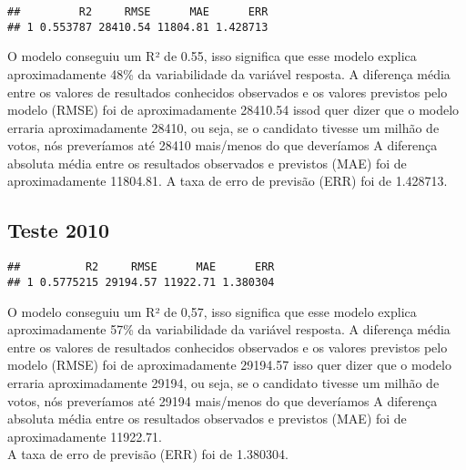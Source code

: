 \documentclass[]{article}
\newenvironment{Shaded}{\begin{snugshade}}{\end{snugshade}}
\newcommand{\KeywordTok}[1]{\textcolor[rgb]{0.13,0.29,0.53}{\textbf{#1}}}
\newcommand{\DataTypeTok}[1]{\textcolor[rgb]{0.13,0.29,0.53}{#1}}
\newcommand{\DecValTok}[1]{\textcolor[rgb]{0.00,0.00,0.81}{#1}}
\newcommand{\StringTok}[1]{\textcolor[rgb]{0.31,0.60,0.02}{#1}}
\newcommand{\OperatorTok}[1]{\textcolor[rgb]{0.81,0.36,0.00}{\textbf{#1}}}
\newcommand{\NormalTok}[1]{#1}
\begin{document}
\begin{verbatim}
##         R2     RMSE      MAE      ERR
## 1 0.553787 28410.54 11804.81 1.428713
\end{verbatim}

O modelo conseguiu um R² de 0.55, isso significa que esse modelo explica
aproximadamente 48\% da variabilidade da variável resposta. A diferença
média entre os valores de resultados conhecidos observados e os valores
previstos pelo modelo (RMSE) foi de aproximadamente 28410.54 issod quer
dizer que o modelo erraria aproximadamente 28410, ou seja, se o
candidato tivesse um milhão de votos, nós preveríamos até 28410
mais/menos do que deveríamos A diferença absoluta média entre os
resultados observados e previstos (MAE) foi de aproximadamente 11804.81.
A taxa de erro de previsão (ERR) foi de 1.428713.

\subsection{Teste 2010}\label{teste-2010-1}

\begin{Shaded}
\end{Shaded}

\begin{verbatim}
##          R2     RMSE      MAE      ERR
## 1 0.5775215 29194.57 11922.71 1.380304
\end{verbatim}

O modelo conseguiu um R² de 0,57, isso significa que esse modelo explica
aproximadamente 57\% da variabilidade da variável resposta. A diferença
média entre os valores de resultados conhecidos observados e os valores
previstos pelo modelo (RMSE) foi de aproximadamente 29194.57 isso quer
dizer que o modelo erraria aproximadamente 29194, ou seja, se o
candidato tivesse um milhão de votos, nós preveríamos até 29194
mais/menos do que deveríamos A diferença absoluta média entre os
resultados observados e previstos (MAE) foi de aproximadamente
11922.71.\\
A taxa de erro de previsão (ERR) foi de 1.380304.
\end{document}
